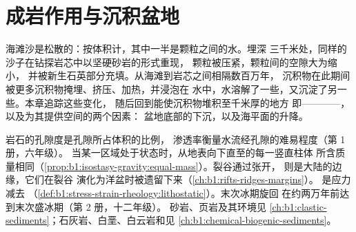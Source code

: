 \chapter{成岩作用与沉积盆地}\label{ch:b1:diagenesis-basins}

海滩沙是松散的：按体积计，其中一半是颗粒之间的水。埋深
三千米处，同样的沙子在钻探岩芯中以坚硬砂岩的形式重现，
颗粒被压紧，颗粒间的空隙大为缩小，
并被新生石英部分充填。从海滩到岩芯之间相隔数百万年，
沉积物在此期间被更多沉积物掩埋、挤压、加热，并浸泡在
水中，水溶解了一些，又沉淀了另一些。本章追踪这些变化，
随后回到能使沉积物堆积至千米厚的地方
即————，以及为其提供空间的两个因素：
盆地底部的下沉，以及海平面的升降。

\begin{recall}
岩石的孔隙度是孔隙所占体积的比例，
渗透率衡量水流经孔隙的难易程度（第 1 册，六年级）。
当某一区域处于状态时，从地表向下直至的每一竖直柱体
所含质量相同（\cref{prop:b1:isostasy-gravity:equal-mass}）。裂谷通过张开，
则是大陆的边缘，它们在裂谷
演化为洋盆时被遗留下来（\cref{ch:b1:rifts-ridges-margins}）。
是应力减去
（\cref{def:b1:stress-strain-rheology:lithostatic}）。末次冰期旋回
在约两万年前达到末次盛冰期（第 2 册，十二年级）。
砂岩、页岩及其环境见
\cref{ch:b1:clastic-sediments}；石灰岩、白垩、白云岩和见
\cref{ch:b1:chemical-biogenic-sediments}。
\end{recall}

